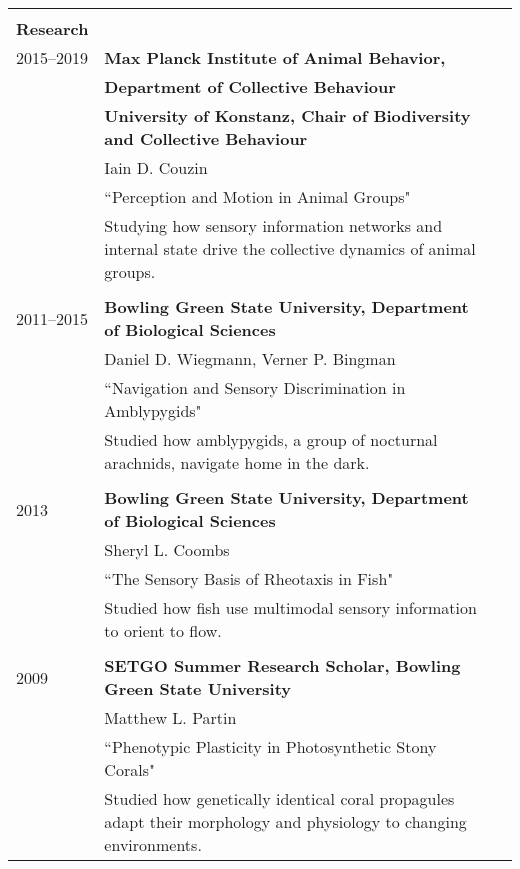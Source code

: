 \documentclass[letterpaper,7pt,oneside]{article}
\begin{document}
\begin{small}
\begin{longtable}{@{} l p{5.3in}l}
 & \\ 


 \Large{\textbf{Research}}  \vspace{5mm} \\
 
 \large{2015–2019}
     & \textbf{Max Planck Institute of Animal Behavior,}\\
     	& \textbf{Department of Collective Behaviour} \\
        & \textbf{University of Konstanz, Chair of Biodiversity and Collective Behaviour} \\
     & Iain D. Couzin \\
     & ``Perception and Motion in Animal Groups"  \vspace{1mm}\\
     & \parbox{5.0in}{Studying how sensory information networks and internal state drive the collective dynamics of animal groups.}\\
     & \\ 
 \large{2011–2015}
     & \textbf{Bowling Green State University, Department of Biological Sciences} \\
     & Daniel D. Wiegmann, Verner P. Bingman \\
     & ``Navigation and Sensory Discrimination in Amblypygids" \vspace{1mm}\\
     & \parbox{5.0in}{Studied how amblypygids, a group of nocturnal arachnids, navigate home in the dark. }\\
     & \\
 \large{2013}
     & \textbf{Bowling Green State University, Department of Biological Sciences} \\
     & Sheryl L. Coombs \\
     & ``The Sensory Basis of Rheotaxis in Fish" \vspace{1mm}\\
     & \parbox{5.0in}{Studied how fish use multimodal sensory information to orient to flow.}\\
     & \\
 \large{2009}
     & \textbf{SETGO Summer Research Scholar, Bowling Green State University} \\
     & Matthew L. Partin \\
     & ``Phenotypic Plasticity in Photosynthetic Stony Corals" \vspace{1mm}\\
     & \parbox{5.0in}{Studied how genetically identical coral propagules adapt their morphology and physiology to changing environments.}\\

\end{longtable}
\end{small}
\end{document}
